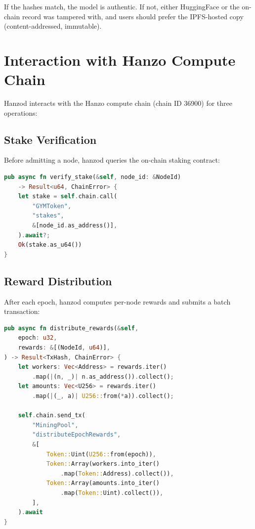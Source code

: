 \documentclass[11pt,letterpaper]{article}
\begin{document}
If the hashes match, the model is authentic.  If not, either HuggingFace or the on-chain record was tampered with, and users should prefer the IPFS-hosted copy (content-addressed, immutable).

\section{Interaction with Hanzo Compute Chain}
\label{sec:chain}

Hanzod interacts with the Hanzo compute chain (chain ID 36900) for three operations:

\subsection{Stake Verification}

Before admitting a node, hanzod queries the on-chain staking contract:

\begin{lstlisting}[language=Rust,caption=On-chain stake verification]
pub async fn verify_stake(&self, node_id: &NodeId)
    -> Result<u64, ChainError> {
    let stake = self.chain.call(
        "GYMToken",
        "stakes",
        &[node_id.as_address()],
    ).await?;
    Ok(stake.as_u64())
}
\end{lstlisting}

\subsection{Reward Distribution}

After each epoch, hanzod computes per-node rewards and submits a batch transaction:

\begin{lstlisting}[language=Rust,caption=Batch reward distribution]
pub async fn distribute_rewards(&self,
    epoch: u32,
    rewards: &[(NodeId, u64)],
) -> Result<TxHash, ChainError> {
    let workers: Vec<Address> = rewards.iter()
        .map(|(n, _)| n.as_address()).collect();
    let amounts: Vec<U256> = rewards.iter()
        .map(|(_, a)| U256::from(*a)).collect();

    self.chain.send_tx(
        "MiningPool",
        "distributeEpochRewards",
        &[
            Token::Uint(U256::from(epoch)),
            Token::Array(workers.into_iter()
                .map(Token::Address).collect()),
            Token::Array(amounts.into_iter()
                .map(Token::Uint).collect()),
        ],
    ).await
}
\end{lstlisting}
\end{document}

